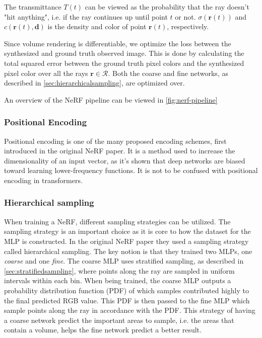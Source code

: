 



The transmittance $T(t)$ can be viewed as the probability that the ray doesn't "hit anything", i.e. if the ray continues up until point $t$ or not. $\sigma(\pmb{r}(t))$ and $c(\pmb{r}(t), \pmb{d})$ is the density and color of point $\pmb{r}(t)$, respectively.

Since volume rendering is differentiable, we optimize the loss between the synthesized and ground truth observed image. This is done by calculating the total squared error between the ground truth pixel colors and the synthesized pixel color over all the rays $\pmb{r} \in \mathcal{R}$. Both the coarse and fine networks, as described in \autoref{sec:hierarchicalsampling}, are optimized over.



An overview of the NeRF pipeline can be viewed in \autoref{fig:nerf-pipeline}



\subsubsection{Positional Encoding} \label{sec:positionalencoding}
Positional encoding is one of the many proposed encoding schemes, first introduced in the original NeRF paper. It is a method used to increase the dimensionality of an input vector, as it's shown that deep networks are biased toward learning lower-frequency functions. It is not to be confused with positional encoding in transformers. 

\subsubsection{Hierarchical sampling} \label{sec:hierarchicalsampling}
When training a NeRF, different sampling strategies can be utilized. The sampling strategy is an important choice as it is core to how the dataset for the MLP is constructed. In the original NeRF paper they used a sampling strategy called hierarchical sampling. The key notion is that they trained two MLPs, one \textit{coarse} and one \textit{fine}. The coarse MLP uses stratified sampling, as described in \autoref{sec:stratifiedsampling}, where points along the ray are sampled in uniform intervals within each bin. When being trained, the coarse MLP outputs a probability distribution function (PDF) of which samples contributed highly to the final predicted RGB value. This PDF is then passed to the fine MLP which sample points along the ray in accordance with the PDF. This strategy of having a coarse network predict the important areas to sample, i.e. the areas that contain a volume, helps the fine network predict a better result.

